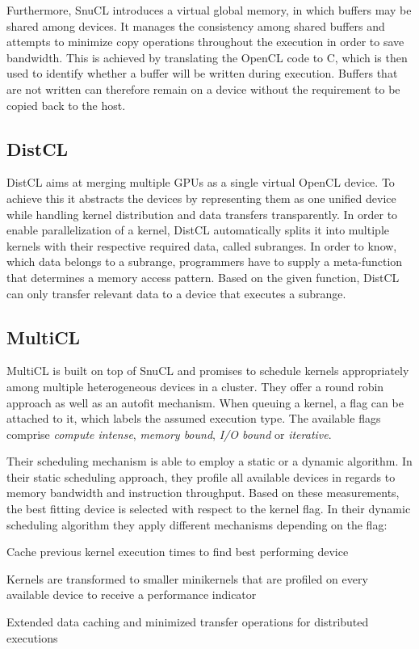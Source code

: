 Furthermore, SnuCL introduces a virtual global memory, in which buffers may be shared among devices. It manages the consistency among shared buffers and attempts to minimize copy operations throughout the execution in order to save bandwidth. This is achieved by translating the OpenCL code to C, which is then used to identify whether a buffer will be written during execution. Buffers that are not written can therefore remain on a device without the requirement to be copied back to the host.

\subsection*{DistCL}
DistCL aims at merging multiple GPUs as a single virtual OpenCL device\cite{distcl}. To achieve this it abstracts the devices by representing them as one unified device while handling kernel distribution and data transfers transparently. In order to enable parallelization of a kernel, DistCL automatically splits it into multiple kernels with their respective required data, called subranges. In order to know, which data belongs to a subrange, programmers have to supply a meta-function that determines a memory access pattern. Based on the given function, DistCL can only transfer relevant data to a device that executes a subrange.

\subsection*{MultiCL}

MultiCL is built on top of SnuCL and promises to schedule kernels appropriately among multiple heterogeneous devices in a cluster\cite{multicl}. They offer a round robin approach as well as an autofit mechanism. When queuing a kernel, a flag can be attached to it, which labels the assumed execution type. The available flags comprise \textit{compute intense}, \textit{memory bound}, \textit{I/O bound} or \textit{iterative}.

Their scheduling mechanism is able to employ a static or a dynamic algorithm. In their static scheduling approach, they profile all available devices in regards to memory bandwidth and instruction throughput. Based on these measurements, the best fitting device is selected with respect to the kernel flag. In their dynamic scheduling algorithm they apply different mechanisms depending on the flag:

\begin{description}[align=left,leftmargin=0cm]
\item [Iterative] Cache previous kernel execution times to find best performing device
\item [Compute-intensive] Kernels are transformed to smaller minikernels that are profiled on every available device to receive a performance indicator
\item [I/O-intensive] Extended data caching and minimized transfer operations for distributed executions
\end{description}

